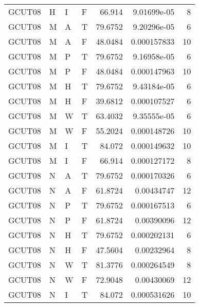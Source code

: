 \begin{longtable}{llllrrr}
    GCUT08   & H         & I         & F          & 66.914     & 9.01699e-05 & 8        \\
    GCUT08   & M         & A         & T          & 79.6752    & 9.20296e-05 & 6        \\
    GCUT08   & M         & A         & F          & 48.0484    & 0.000157833 & 10       \\
    GCUT08   & M         & P         & T          & 79.6752    & 9.16958e-05 & 6        \\
    GCUT08   & M         & P         & F          & 48.0484    & 0.000147963 & 10       \\
    GCUT08   & M         & H         & T          & 79.6752    & 9.43184e-05 & 6        \\
    GCUT08   & M         & H         & F          & 39.6812    & 0.000107527 & 6        \\
    GCUT08   & M         & W         & T          & 63.4032    & 9.35555e-05 & 6        \\
    GCUT08   & M         & W         & F          & 55.2024    & 0.000148726 & 10       \\
    GCUT08   & M         & I         & T          & 84.072     & 0.000149632 & 10       \\
    GCUT08   & M         & I         & F          & 66.914     & 0.000127172 & 8        \\
    GCUT08   & N         & A         & T          & 79.6752    & 0.000170326 & 6        \\
    GCUT08   & N         & A         & F          & 61.8724    & 0.00434747  & 12       \\
    GCUT08   & N         & P         & T          & 79.6752    & 0.000167513 & 6        \\
    GCUT08   & N         & P         & F          & 61.8724    & 0.00390096  & 12       \\
    GCUT08   & N         & H         & T          & 79.6752    & 0.000202131 & 6        \\
    GCUT08   & N         & H         & F          & 47.5604    & 0.00232964  & 8        \\
    GCUT08   & N         & W         & T          & 81.3776    & 0.000264549 & 8        \\
    GCUT08   & N         & W         & F          & 72.9048    & 0.00430069  & 12       \\
    GCUT08   & N         & I         & T          & 84.072     & 0.000531626 & 10       \\

\end{longtable}
